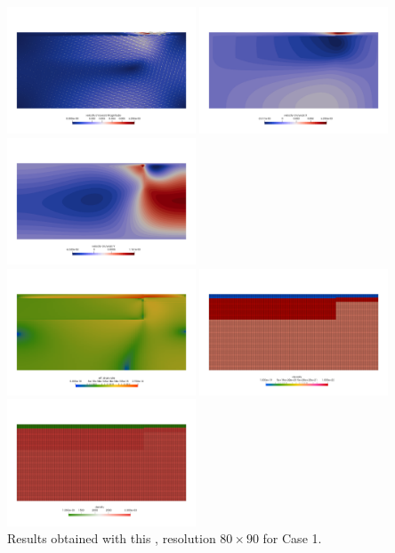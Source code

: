 \begin{center}
\includegraphics[width=5.6cm]{python_codes/fieldstone_118/results/case1/stone/vel}
\includegraphics[width=5.6cm]{python_codes/fieldstone_118/results/case1/stone/u}
\includegraphics[width=5.6cm]{python_codes/fieldstone_118/results/case1/stone/v}\\
\includegraphics[width=5.6cm]{python_codes/fieldstone_118/results/case1/stone/sr}
\includegraphics[width=5.6cm]{python_codes/fieldstone_118/results/case1/stone/eta}
\includegraphics[width=5.6cm]{python_codes/fieldstone_118/results/case1/stone/rho}\\
{\captionfont Results obtained with this \stone, resolution  $80\times 90$ for Case 1.}
\end{center}

